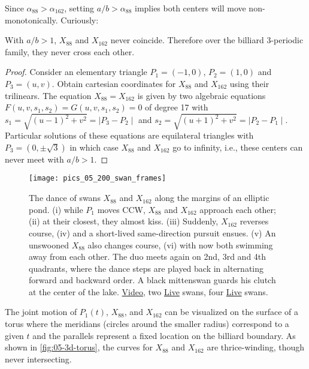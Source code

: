 Since $\alpha_{88}>\alpha_{162}$, setting $a/b>\alpha_{88}$ implies both centers will move non-monotonically. Curiously:

\begin{proposition}
With $a/b>1$, $X_{88}$ and $X_{162}$ never coincide. Therefore over the billiard 3-periodic family, they never cross each other.
\end{proposition}

\begin{proof}
Consider an elementary triangle $P_1=(-1,0)$, $P_2=(1,0)$ and $P_3=(u,v)$. Obtain cartesian coordinates for $X_{88}$ and $X_{162}$ using their trilinears. The equation $X_{88}=X_{162}$ is given by two algebraic equations $F(u,v,s_1,s_2)=G(u,v,s_1,s_2)=0$ of degree 17 with   $s_1=\sqrt{(u-1)^2+v^2}=\mid P_3-P_2\mid$ and $s_2=\sqrt{(u+1)^2+v^2}=\mid P_2-P_1\mid$.
Particular solutions of these equations are    equilateral triangles with $P_3=(0,\pm \sqrt{3})$ in which case $X_{88}$ and $X_{162}$ go to infinity, i.e., these centers can never meet with $a/b>1$.
\end{proof}

\begin{figure}
    \centering
    \texttt{[image: pics\_05\_200\_swan\_frames]}
    \caption{The dance of swans $X_{88}$ and $X_{162}$ along the margins of an elliptic pond. (i) while $P_1$ moves CCW, $X_{88}$ and $X_{162}$ approach each other; (ii) at their closest, they almost kiss. (iii) Suddenly, $X_{162}$ reverses course, (iv) and a short-lived same-direction pursuit ensues. (v) An unswooned $X_{88}$ also changes course, (vi) with now both swimming away from each other. The duo meets again on 2nd, 3rd and 4th quadrants, where the dance steps are played back in alternating forward and backward order. A black mittenswan guards his clutch at the center of the lake. \href{https://youtu.be/ljGTtA1x-Sk}{Video}, two \href{https://bit.ly/3f6M9Wh}{Live} swans, four \href{https://bit.ly/3oDhMdd}{Live} swans.}
    \label{fig:x88-x162}
\end{figure}

The joint motion of $P_1(t)$, $X_{88}$, and $X_{162}$ can be visualized on the surface of a torus where the meridians (circles around the smaller radius) correspond to a given $t$ and the parallels represent a fixed location on the billiard boundary. As shown in \cref{fig:05-3d-torus}, the curves for $X_{88}$ and $X_{162}$ are thrice-winding, though never intersecting.

